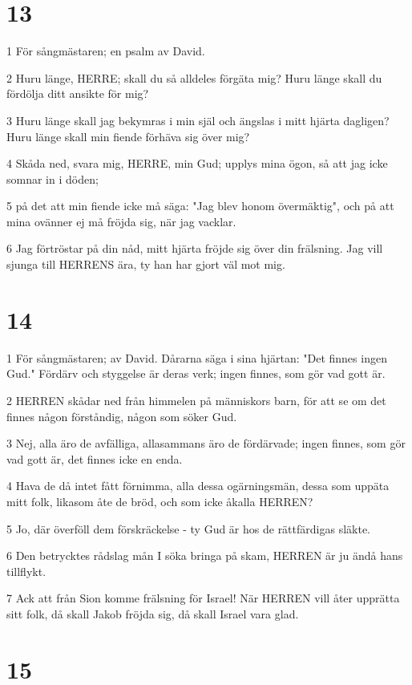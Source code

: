 \chapter{13}

\par 1 För sångmästaren; en psalm av David.
\par 2 Huru länge, HERRE; skall du så alldeles förgäta mig? Huru länge skall du fördölja ditt ansikte för mig?
\par 3 Huru länge skall jag bekymras i min själ och ängslas i mitt hjärta dagligen? Huru länge skall min fiende förhäva sig över mig?
\par 4 Skåda ned, svara mig, HERRE, min Gud; upplys mina ögon, så att jag icke somnar in i döden;
\par 5 på det att min fiende icke må säga: "Jag blev honom övermäktig", och på att mina ovänner ej må fröjda sig, när jag vacklar.
\par 6 Jag förtröstar på din nåd, mitt hjärta fröjde sig över din frälsning. Jag vill sjunga till HERRENS ära, ty han har gjort väl mot mig.

\chapter{14}

\par 1 För sångmästaren; av David. Dårarna säga i sina hjärtan: "Det finnes ingen Gud." Fördärv och styggelse är deras verk; ingen finnes, som gör vad gott är.
\par 2 HERREN skådar ned från himmelen på människors barn, för att se om det finnes någon förståndig, någon som söker Gud.
\par 3 Nej, alla äro de avfälliga, allasammans äro de fördärvade; ingen finnes, som gör vad gott är, det finnes icke en enda.
\par 4 Hava de då intet fått förnimma, alla dessa ogärningsmän, dessa som uppäta mitt folk, likasom åte de bröd, och som icke åkalla HERREN?
\par 5 Jo, där överföll dem förskräckelse - ty Gud är hos de rättfärdigas släkte.
\par 6 Den betrycktes rådslag mån I söka bringa på skam, HERREN är ju ändå hans tillflykt.
\par 7 Ack att från Sion komme frälsning för Israel! När HERREN vill åter upprätta sitt folk, då skall Jakob fröjda sig, då skall Israel vara glad.

\chapter{15}

